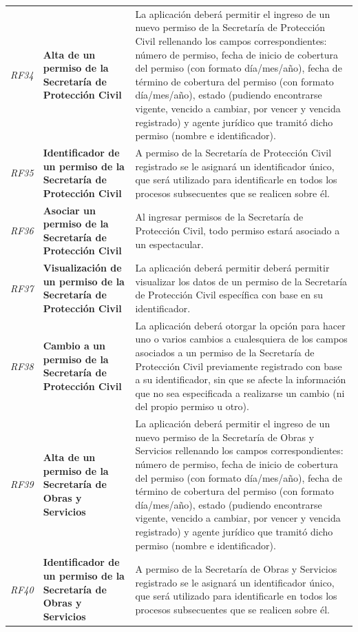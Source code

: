 \documentclass[12pt]{article}
\begin{document}
{\begin{longtable}[H]{m{2cm}m{4cm}m{6cm}}
     \textit{RF34} & \textbf{Alta de un permiso de la Secretaría de Protección Civil} & La aplicación deberá permitir el ingreso de un nuevo permiso de la Secretaría de Protección Civil rellenando los campos correspondientes: número de permiso, fecha de inicio de cobertura del permiso (con formato día/mes/año), fecha de término de cobertura del permiso (con formato día/mes/año), estado (pudiendo encontrarse vigente, vencido a cambiar, por vencer y vencida registrado) y agente jurídico que tramitó dicho permiso (nombre e identificador).\tabularnewline
     \textit{RF35} & \textbf{Identificador de un permiso de la Secretaría de Protección Civil} & A permiso de la Secretaría de Protección Civil registrado se le asignará un identificador único, que será utilizado para identificarle en todos los procesos subsecuentes que se realicen sobre él. \tabularnewline
     \textit{RF36} & \textbf{Asociar un permiso de la Secretaría de Protección Civil} & Al ingresar permisos de la Secretaría de Protección Civil, todo permiso estará asociado a un espectacular. \tabularnewline
     \textit{RF37} & \textbf{Visualización de un permiso de la Secretaría de Protección Civil} & La aplicación deberá permitir deberá permitir visualizar los datos de un permiso de la Secretaría de Protección Civil específica con base en su identificador.\tabularnewline
     \textit{RF38} & \textbf{Cambio a un permiso de la Secretaría de Protección Civil} & La aplicación deberá otorgar la opción para hacer uno o varios cambios a cualesquiera de los campos asociados a un permiso de la Secretaría de Protección Civil previamente registrado con base a su identificador, sin que se afecte la información que no sea especificada a realizarse un cambio (ni del propio permiso u otro).\tabularnewline
     \textit{RF39} & \textbf{Alta de un permiso de la Secretaría de Obras y Servicios} & La aplicación deberá permitir el ingreso de un nuevo permiso de la Secretaría de Obras y Servicios rellenando los campos correspondientes: número de permiso, fecha de inicio de cobertura del permiso (con formato día/mes/año), fecha de término de cobertura del permiso (con formato día/mes/año), estado (pudiendo encontrarse vigente, vencido a cambiar, por vencer y vencida registrado) y agente jurídico que tramitó dicho permiso (nombre e identificador).\tabularnewline
     \textit{RF40} & \textbf{Identificador de un permiso de la Secretaría de Obras y Servicios} & A permiso de la Secretaría de Obras y Servicios registrado se le asignará un identificador único, que será utilizado para identificarle en todos los procesos subsecuentes que se realicen sobre él. \tabularnewline

\end{longtable}}
\end{document}
